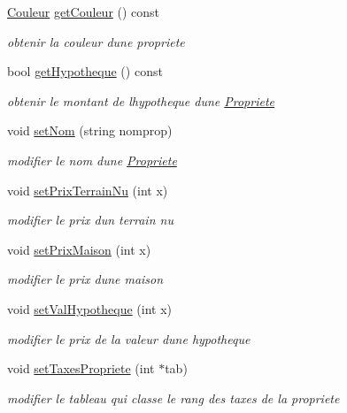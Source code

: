 \begin{DoxyCompactItemize}
\hyperlink{classCouleur}{Couleur} \hyperlink{classPropriete_ac0a961266a4a34726fc09706f7ada70c}{get\+Couleur} () const 
\begin{DoxyCompactList}\small\item\em obtenir la couleur d\textquotesingle{}une propriete \end{DoxyCompactList}\item 
bool \hyperlink{classPropriete_ad4c76cf1b1e1e5081b10445f3b2eb3bc}{get\+Hypotheque} () const 
\begin{DoxyCompactList}\small\item\em obtenir le montant de l\textquotesingle{}hypotheque d\textquotesingle{}une \hyperlink{classPropriete}{Propriete} \end{DoxyCompactList}\item 
void \hyperlink{classPropriete_aaa4cb797b5ca4068c3e1154407726566}{set\+Nom} (string nomprop)
\begin{DoxyCompactList}\small\item\em modifier le nom d\textquotesingle{}une \hyperlink{classPropriete}{Propriete} \end{DoxyCompactList}\item 
void \hyperlink{classPropriete_a513be0d07d243282d5f33d72ee478356}{set\+Prix\+Terrain\+Nu} (int x)
\begin{DoxyCompactList}\small\item\em modifier le prix d\textquotesingle{}un terrain nu \end{DoxyCompactList}\item 
void \hyperlink{classPropriete_a43b101d4b05db64c193094dbe0a20d00}{set\+Prix\+Maison} (int x)
\begin{DoxyCompactList}\small\item\em modifier le prix d\textquotesingle{}une maison \end{DoxyCompactList}\item 
void \hyperlink{classPropriete_ab7d23b4a14f650f3540a44fa2c4da922}{set\+Val\+Hypotheque} (int x)
\begin{DoxyCompactList}\small\item\em modifier le prix de la valeur d\textquotesingle{}une hypotheque \end{DoxyCompactList}\item 
void \hyperlink{classPropriete_a4833cafa66f5635ddb8037bc07fe13e2}{set\+Taxes\+Propriete} (int $\ast$tab)
\begin{DoxyCompactList}\small\item\em modifier le tableau qui classe le rang des taxes de la propriete \end{DoxyCompactList}\item 

\end{DoxyCompactItemize}
